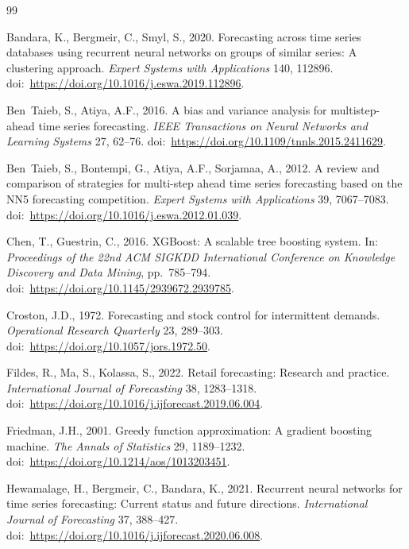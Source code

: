 \documentclass[review,authoryear]{elsarticle}
\begin{document}

\begin{thebibliography}{99}

Bandara, K., Bergmeir, C., Smyl, S., 2020.
Forecasting across time series databases using recurrent neural networks on groups of similar series: A clustering approach.
\textit{Expert Systems with Applications} 140, 112896.
doi:\ \url{https://doi.org/10.1016/j.eswa.2019.112896}.

Ben~Taieb, S., Atiya, A.F., 2016.
A bias and variance analysis for multistep-ahead time series forecasting.
\textit{IEEE Transactions on Neural Networks and Learning Systems} 27, 62--76.
doi:\ \url{https://doi.org/10.1109/tnnls.2015.2411629}.

Ben~Taieb, S., Bontempi, G., Atiya, A.F., Sorjamaa, A., 2012.
A review and comparison of strategies for multi-step ahead time series forecasting based on the NN5 forecasting competition.
\textit{Expert Systems with Applications} 39, 7067--7083.
doi:\ \url{https://doi.org/10.1016/j.eswa.2012.01.039}.

Chen, T., Guestrin, C., 2016.
XGBoost: A scalable tree boosting system.
In: \textit{Proceedings of the 22nd ACM SIGKDD International Conference on Knowledge Discovery and Data Mining}, pp.\ 785--794.
doi:\ \url{https://doi.org/10.1145/2939672.2939785}.

Croston, J.D., 1972.
Forecasting and stock control for intermittent demands.
\textit{Operational Research Quarterly} 23, 289--303.
doi:\ \url{https://doi.org/10.1057/jors.1972.50}.

Fildes, R., Ma, S., Kolassa, S., 2022.
Retail forecasting: Research and practice.
\textit{International Journal of Forecasting} 38, 1283--1318.
doi:\ \url{https://doi.org/10.1016/j.ijforecast.2019.06.004}.

Friedman, J.H., 2001.
Greedy function approximation: A gradient boosting machine.
\textit{The Annals of Statistics} 29, 1189--1232.
doi:\ \url{https://doi.org/10.1214/aos/1013203451}.

Hewamalage, H., Bergmeir, C., Bandara, K., 2021.
Recurrent neural networks for time series forecasting: Current status and future directions.
\textit{International Journal of Forecasting} 37, 388--427.
doi:\ \url{https://doi.org/10.1016/j.ijforecast.2020.06.008}.


\end{thebibliography}
\end{document}
